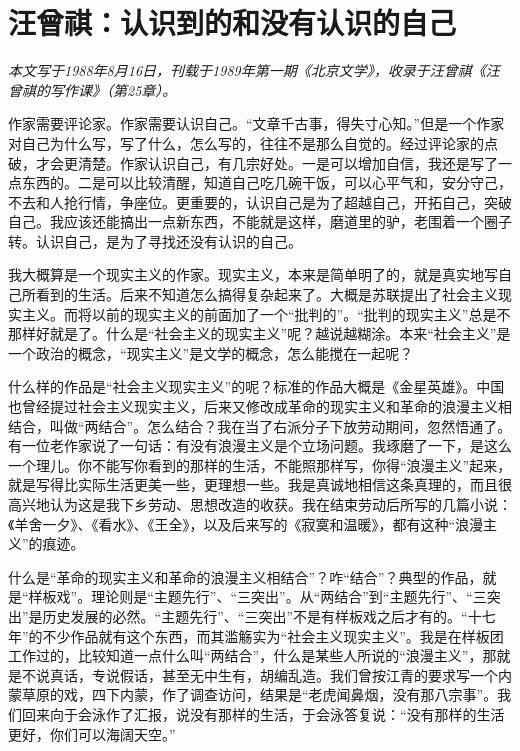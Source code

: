 \documentclass[12pt,a5paper]{ctexbook}
\begin{document}
\newpage

\section{汪曾祺：认识到的和没有认识的自己}

\emph{本文写于1988年8月16日，刊载于1989年第一期《北京文学》，收录于汪曾祺《汪曾祺的写作课》（第25章）。}
\vspace{2em}

作家需要评论家。作家需要认识自己。“文章千古事，得失寸心知。”但是一个作家对自己为什么写，写了什么，怎么写的，往往不是那么自觉的。经过评论家的点破，才会更清楚。作家认识自己，有几宗好处。一是可以增加自信，我还是写了一点东西的。二是可以比较清醒，知道自己吃几碗干饭，可以心平气和，安分守己，不去和人抢行情，争座位。更重要的，认识自己是为了超越自己，开拓自己，突破自己。我应该还能搞出一点新东西，不能就是这样，磨道里的驴，老围着一个圈子转。认识自己，是为了寻找还没有认识的自己。

我大概算是一个现实主义的作家。现实主义，本来是简单明了的，就是真实地写自己所看到的生活。后来不知道怎么搞得复杂起来了。大概是苏联提出了社会主义现实主义。而将以前的现实主义的前面加了一个“批判的”。“批判的现实主义”总是不那样好就是了。什么是“社会主义的现实主义”呢？越说越糊涂。本来“社会主义”是一个政治的概念，“现实主义”是文学的概念，怎么能搅在一起呢？

什么样的作品是“社会主义现实主义”的呢？标准的作品大概是《金星英雄》。中国也曾经提过社会主义现实主义，后来又修改成革命的现实主义和革命的浪漫主义相结合，叫做“两结合”。怎么结合？我在当了右派分子下放劳动期间，忽然悟通了。有一位老作家说了一句话：有没有浪漫主义是个立场问题。我琢磨了一下，是这么一个理儿。你不能写你看到的那样的生活，不能照那样写，你得“浪漫主义”起来，就是写得比实际生活更美一些，更理想一些。我是真诚地相信这条真理的，而且很高兴地认为这是我下乡劳动、思想改造的收获。我在结束劳动后所写的几篇小说：《羊舍一夕》、《看水》、《王全》，以及后来写的《寂寞和温暖》，都有这种“浪漫主义”的痕迹。

什么是“革命的现实主义和革命的浪漫主义相结合”？咋“结合”？典型的作品，就是“样板戏”。理论则是“主题先行”、“三突出”。从“两结合”到“主题先行”、“三突出”是历史发展的必然。“主题先行”、“三突出”不是有样板戏之后才有的。“十七年”的不少作品就有这个东西，而其滥觞实为“社会主义现实主义”。我是在样板团工作过的，比较知道一点什么叫“两结合”，什么是某些人所说的“浪漫主义”，那就是不说真话，专说假话，甚至无中生有，胡编乱造。我们曾按江青的要求写一个内蒙草原的戏，四下内蒙，作了调查访问，结果是“老虎闻鼻烟，没有那八宗事”。我们回来向于会泳作了汇报，说没有那样的生活，于会泳答复说：“没有那样的生活更好，你们可以海阔天空。”
\end{document}
